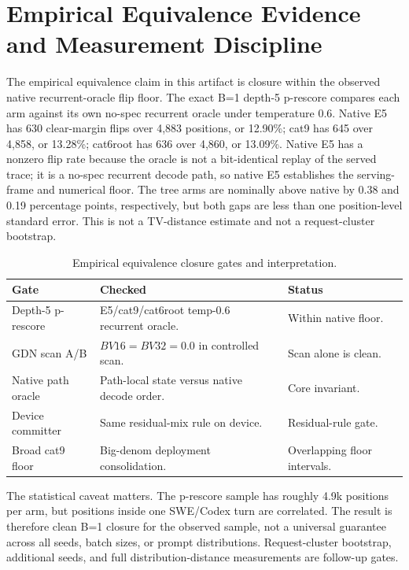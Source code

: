 \documentclass[conference]{IEEEtran}
\newcommand{\rowsep}{\specialrule{0.15pt}{1.2pt}{1.2pt}}
\begin{document}
\section{Empirical Equivalence Evidence and Measurement Discipline}
\label{sec:equivalence}

The empirical equivalence claim in this artifact is closure within the observed native recurrent-oracle flip floor. The exact B=1 depth-5 p-rescore compares each arm against its own no-spec recurrent oracle under temperature 0.6. Native E5 has 630 clear-margin flips over 4,883 positions, or 12.90\%; cat9 has 645 over 4,858, or 13.28\%; cat6root has 636 over 4,860, or 13.09\%. Native E5 has a nonzero flip rate because the oracle is not a bit-identical replay of the served trace; it is a no-spec recurrent decode path, so native E5 establishes the serving-frame and numerical floor. The tree arms are nominally above native by 0.38 and 0.19 percentage points, respectively, but both gaps are less than one position-level standard error. This is not a TV-distance estimate and not a request-cluster bootstrap.

\begin{table}[t]
\caption{Empirical equivalence closure gates and interpretation.}
\label{tab:lossless}
\centering
\scriptsize
\begin{adjustbox}{width=\columnwidth}
\begin{tabular}{L{0.27\columnwidth} L{0.35\columnwidth} L{0.28\columnwidth}}
\toprule
Gate & Checked & Status \\
\midrule
Depth-5 p-rescore & E5/cat9/cat6root temp-0.6 recurrent oracle. & Within native floor. \\
\rowsep
GDN scan A/B & \(BV16=BV32=0.0\) in controlled scan. & Scan alone is clean. \\
\rowsep
Native path oracle & Path-local state versus native decode order. & Core invariant. \\
\rowsep
Device committer & Same residual-mix rule on device. & Residual-rule gate. \\
\rowsep
Broad cat9 floor & Big-denom deployment consolidation. & Overlapping floor intervals. \\
\bottomrule
\end{tabular}
\end{adjustbox}
\end{table}

The statistical caveat matters. The p-rescore sample has roughly 4.9k positions per arm, but positions inside one SWE/Codex turn are correlated. The result is therefore clean B=1 closure for the observed sample, not a universal guarantee across all seeds, batch sizes, or prompt distributions. Request-cluster bootstrap, additional seeds, and full distribution-distance measurements are follow-up gates.
\end{document}
